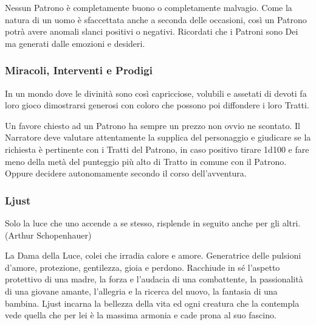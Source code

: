 \begin{multicols}{2}
\medskip

Nessun Patrono è completamente buono o completamente malvagio. Come la natura di un uomo è sfaccettata anche a seconda delle occasioni, così un Patrono potrà avere anomali slanci positivi o negativi. Ricordati che i Patroni sono Dei ma generati dalle emozioni e desideri.


\subsubsection{Miracoli, Interventi e Prodigi}

In un mondo dove le divinità sono così capricciose, volubili e assetati di devoti fa loro gioco dimostrarsi generosi con coloro che possono poi diffondere i loro Tratti.

Un favore chiesto ad un Patrono ha sempre un prezzo non ovvio ne scontato. Il Narratore deve valutare attentamente la supplica del personaggio e giudicare se la richiesta è pertinente con i Tratti del Patrono, in caso positivo tirare 1d100 e fare meno della metà del punteggio più alto di Tratto in comune con il Patrono. Oppure decidere autonomamente secondo il corso dell'avventura.



\subsubsection{Ljust}\label{ljust}\hypertarget{ljust}{}



\begin{changemargin}{0.3cm}{0.3cm}\begin{enfasi}{
Solo la luce che uno accende a se stesso, risplende in seguito anche per gli altri. (Arthur Schopenhauer)
}\end{enfasi}\end{changemargin}

La Dama della Luce, colei che irradia calore e amore. Generatrice delle pulsioni d'amore, protezione, gentilezza, gioia e perdono. Racchiude in sé l'aspetto protettivo di una madre, la forza e l'audacia di una combattente, la passionalità di una giovane amante, l'allegria e la ricerca del nuovo, la fantasia di una bambina. Ljust incarna la bellezza della vita ed ogni creatura che la contempla vede quella che per lei è la massima armonia e cade prona al suo fascino.


\end{multicols}
